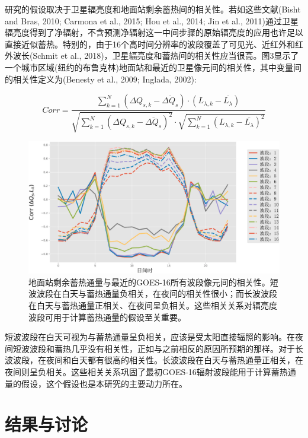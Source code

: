 \documentclass[3p,times]{elsarticle}
\begin{document}
研究的假设取决于卫星辐亮度和地面站剩余蓄热间的相关性。若如这些文献(Bisht and Bras, 2010; Carmona et al., 2015; Hou et al., 2014; Jin et al., 2011)通过卫星辐亮度得到了净辐射，不含预测净辐射这一中间步骤的原始辐亮度的应用也许足以直接近似蓄热。特别的，由于16个高时间分辨率的波段覆盖了可见光、近红外和红外波长(Schmit et al., 2018)，卫星辐亮度和蓄热间的相关性应当很高。图3显示了一个城市区域(纽约的布鲁克林)地面站和最近的卫星像元间的相关性，其中变量间的相关性定义为(Benesty et al., 2009; Inglada, 2002):

\begin{equation}
    Corr=\frac{\sum_{k=1}^N(\Delta Q_{s,k}-\overline{\Delta Q_s})\cdot(L_{\lambda,k}-\overline{L_\lambda})}{\sqrt{\sum_{k=1}^N(\Delta Q_{s,k}-\overline{\Delta Q_s})^2}\cdot\sqrt{\sum_{k=1}^N(L_{\lambda,k}-\overline{L_\lambda})^2}}
\end{equation}

\begin{figure}[htbp]
    \begin{center}
        \includegraphics[width=\linewidth]{img/图3.png}
    \end{center}
    \caption{地面站剩余蓄热通量与最近的GOES-16所有波段像元间的相关性。短波波段在白天与蓄热通量负相关，在夜间的相关性很小；而长波波段在白天与蓄热通量正相关、在夜间呈负相关。这些相关关系对辐亮度波段可用于计算蓄热通量的假设至关重要。}
\end{figure}

短波波段在白天可视为与蓄热通量呈负相关，应该是受太阳直接辐照的影响。在夜间短波波段和蓄热几乎没有相关性，正如与之前相反的原因所预期的那样。对于长波波段，在夜间和白天都有很高的相关性。长波波段在白天与蓄热通量正相关，在夜间则呈负相关。这些相关关系巩固了最初GOES-16辐射波段能用于计算蓄热通量的假设，这个假设也是本研究的主要动力所在。

\section{结果与讨论}
\end{document}
